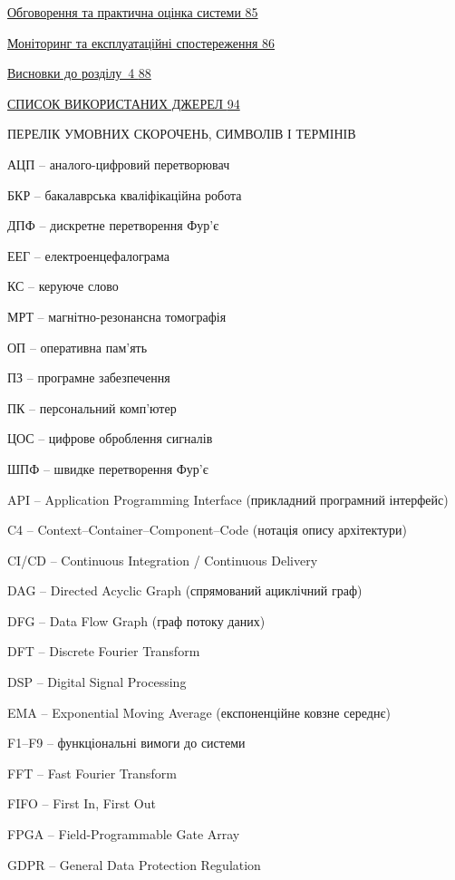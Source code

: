 \hyperref[_Toc229681182]{Обговорення та практична оцінка системи
\hyperref[_Toc229681182]{85}}

\hyperref[_Toc229681187]{Моніторинг та експлуатаційні спостереження
\hyperref[_Toc229681187]{86}}

\hyperref[_Toc229681188]{Висновки до розділу~4
\hyperref[_Toc229681188]{88}}

\hyperref[_Toc228305380]{СПИСОК ВИКОРИСТАНИХ ДЖЕРЕЛ
\hyperref[_Toc228305380]{94}}

\protect{}\label{_Toc229682902}{}ПЕРЕЛІК УМОВНИХ СКОРОЧЕНЬ,
СИМВОЛІВ І ТЕРМІНІВ

АЦП -- аналого-цифровий перетворювач

БКР -- бакалаврська кваліфікаційна робота

ДПФ -- дискретне перетворення Фур'є

ЕЕГ -- електроенцефалограма

КС -- керуюче слово

МРТ -- магнітно-резонансна томографія

ОП -- оперативна пам'ять

ПЗ -- програмне забезпечення

ПК -- персональний комп'ютер

ЦОС -- цифрове оброблення сигналів

ШПФ -- швидке перетворення Фур'є

API -- Application Programming Interface (прикладний програмний
інтерфейс)

C4 -- Context--Container--Component--Code (нотація опису архітектури)

CI/CD -- Continuous Integration / Continuous Delivery

DAG -- Directed Acyclic Graph (спрямований ациклічний граф)

DFG -- Data Flow Graph (граф потоку даних)

DFT -- Discrete Fourier Transform

DSP -- Digital Signal Processing

EMA -- Exponential Moving Average (експоненційне ковзне середнє)

F1--F9 -- функціональні вимоги до системи

FFT -- Fast Fourier Transform

FIFO -- First In, First Out

FPGA -- Field-Programmable Gate Array

GDPR -- General Data Protection Regulation

